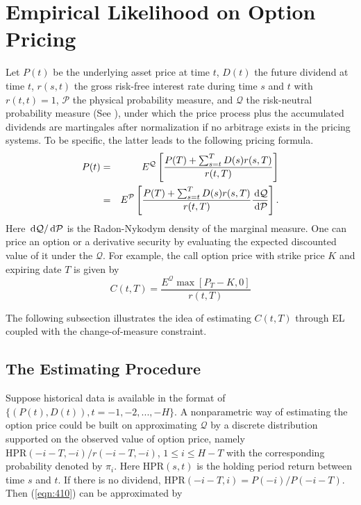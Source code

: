  
\section{Empirical Likelihood on Option Pricing}
Let $P(t)$ be the underlying asset price at time $t$, $D(t)$  the future dividend at time $t$, $r(s,t)$ the gross risk-free interest rate during time $s$ and $t$ with $r(t,t)=1$,  $\mathcal{P}$ the physical probability measure, and $\mathcal{Q}$  the risk-neutral probability measure (See \citet{huang1988foundations}), under which the price process plus the accumulated dividends are martingales after normalization if no arbitrage exists in the pricing systems. To be specific, the latter leads to the following pricing formula.
\begin{eqnarray}
P(t)&=&E^{\mathcal{Q}}\left[\frac{P(T)+\sum_{s=t}^{T}D(s)r(s,T)}{r(t,T)}\right]\label{eqn:410}\\
&=&E^{\mathcal{P}}\left[\frac{P(T)+\sum_{s=t}^{T}D(s)r(s,T)}{r(t,T)}\frac{\,\mathrm{d}\mathcal{Q}}{\,\mathrm{d}\mathcal{P}}\right].\nonumber
\end{eqnarray}
Here $\,\mathrm{d}\mathcal{Q}/ \,\mathrm{d}\mathcal{P}$ is the Radon-Nykodym density of the marginal measure. One can price an option or a derivative security by evaluating the expected discounted value of it under the $\mathcal{Q}$. For example, the call option price with strike price $K$ and expiring date $T$ is given by
\begin{equation}\label{eqn:4102}
C(t,T)=\frac{E ^{\mathcal{Q}}  \max[P_T - K,0]   }{r(t,T)} 
\end{equation} 

The following subsection illustrates the idea of estimating $C(t,T)$  through EL coupled with the change-of-measure constraint. 

\subsection{The Estimating Procedure}
Suppose historical data is available in the format of $\{(P(t),D(t)),t=-1,-2,...,-H\}$. A nonparametric way of estimating the option price could be built on approximating $\mathcal{Q}$ by a discrete distribution supported on the observed value of option price, namely $\mathrm{HPR}(-i-T,-i)/r(-i-T,-i)$, $1\leq i\leq H-T$ with the corresponding probability denoted by $\pi_i$. Here $\mathrm{HPR}(s,t)$ is the holding period return between time $s$ and $t$. If there is no dividend, $\mathrm{HPR}(-i-T,i)=P(-i)/P(-i-T)$. Then (\ref{eqn:410}) can be approximated by 

